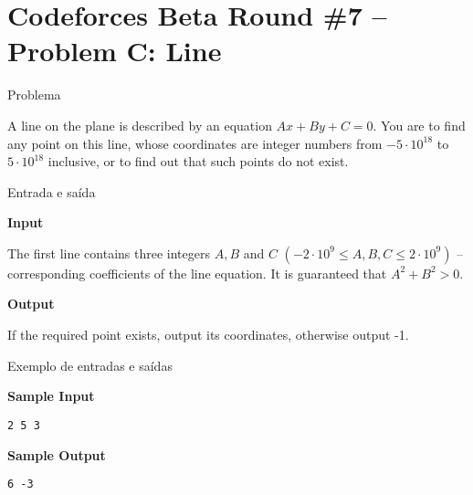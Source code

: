 \section{Codeforces Beta Round \#7 -- Problem C: Line}

\begin{frame}[fragile]{Problema}

A line on the plane is described by an equation $Ax + By + C = 0$. You are to find any point on 
this line, whose coordinates are integer numbers from $-5\cdot 10^{18}$ to $5\cdot 10^{18}$ 
inclusive, or to find out that such points do not exist.

\end{frame}

\begin{frame}[fragile]{Entrada e saída}

\textbf{Input}

The first line contains three integers $A, B$ and $C$ $(-2\cdot 10^9\leq A, B, C\leq 2\cdot 10^9)$
-- corresponding coefficients of the line equation. It is guaranteed that $A^2+ B^2 > 0$.

\textbf{Output}

If the required point exists, output its coordinates, otherwise output -1.

\end{frame}

\begin{frame}[fragile]{Exemplo de entradas e saídas}

\begin{minipage}[t]{0.5\textwidth}
\textbf{Sample Input}
\begin{verbatim}
2 5 3
\end{verbatim}
\end{minipage}
\begin{minipage}[t]{0.45\textwidth}
\textbf{Sample Output}
\begin{verbatim}
6 -3
\end{verbatim}
\end{minipage}
\end{frame}

